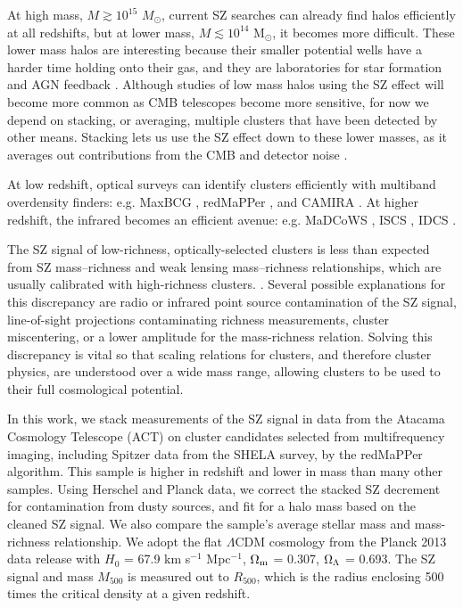 \documentclass[a4paper,fleqn,usenatbib]{mnras}
\begin{document}
At high mass, $M \gtrsim 10^{15}$ $M_\odot$, current SZ searches can already find halos efficiently at all redshifts, but at lower mass, $M \lesssim 10^{14}$ M$_{\odot}$, it becomes more difficult. These lower mass halos are interesting because their smaller potential wells have a harder time holding onto their gas, and they are laboratories for star formation and AGN feedback \citep{2015MNRAS.448.2085L,2013A&A...555A..66L}.  Although studies of low mass halos using the SZ effect will become more common as CMB telescopes become more sensitive, for now we depend on stacking, or averaging, multiple clusters that have been detected by other means.  Stacking lets us use the SZ effect down to these lower masses, as it averages out contributions from the CMB and detector noise \citep{2013ApJ...767...38S, 2011A&A...536A..12P, 2011ApJ...736...39H}.

At low redshift, optical surveys can identify clusters efficiently with multiband overdensity finders: e.g. MaxBCG \citep{2007ApJ...660..221K}, redMaPPer \citep{2014ApJ...785..104R}, and CAMIRA \citep{2014MNRAS.444..147O}.
At higher redshift, the infrared becomes an efficient avenue: e.g. MaDCoWS \citep{2014ApJS..213...25S}, ISCS 
\citep{2008ApJ...684..905E}, IDCS \citep{2012ApJ...753..164S}.

The SZ signal of low-richness, optically-selected clusters is less than expected from SZ mass--richness and weak lensing mass--richness relationships, which are usually calibrated with high-richness clusters.  \citep{2011A&A...536A..12P,2012PhRvD..85b3005D,2013ApJ...767...38S,2016arXiv160508770S}. Several possible explanations for this discrepancy are radio or infrared point source contamination of the SZ signal, line-of-sight projections contaminating richness measurements, cluster miscentering, or a lower amplitude for the mass-richness relation. Solving this discrepancy is vital so that scaling relations for clusters, and therefore cluster physics, are understood over a wide mass range, allowing clusters to be used to their full cosmological potential.

In this work, we stack measurements of the SZ signal in data from the Atacama Cosmology Telescope (ACT) on cluster candidates selected from multifrequency imaging, including Spitzer data from the SHELA survey, by the redMaPPer algorithm.  This sample is higher in redshift and lower in mass than many other samples. Using Herschel and Planck data, we correct the stacked SZ decrement for contamination from dusty sources, and fit for a halo mass based on the cleaned SZ signal. We also compare the sample's average stellar mass and mass-richness relationship.
We adopt the flat $\Lambda$CDM cosmology from the Planck 2013 data release \citep{2014A&A...571A..16P} with $H_{0}$ = 67.9 km s$^{-1}$ Mpc$^{-1}$, $\Omega_{\rm m}$ = 0.307, $\Omega_{\rm \Lambda}$ = 0.693. The SZ signal and mass $M_{500}$ is measured out to $R_{500}$, which is the radius enclosing 500 times the critical density at a given redshift.
\end{document}
